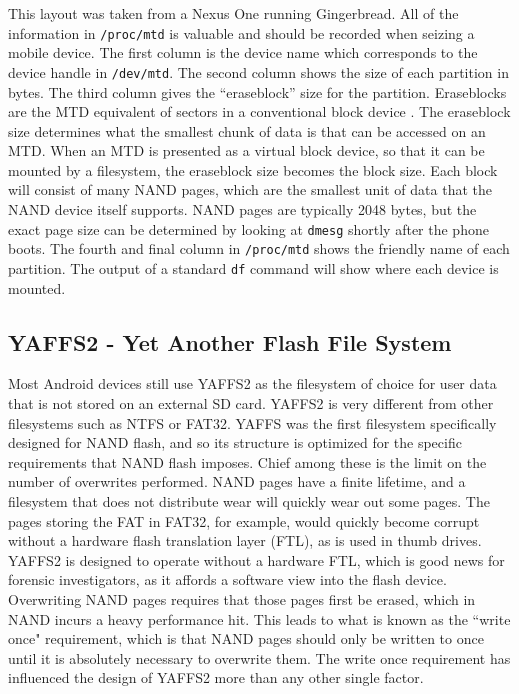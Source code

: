 This layout was taken from a Nexus One running Gingerbread.  All of the information in \texttt{/proc/mtd} is valuable and should be
recorded when seizing a mobile device. The first column is the device name which corresponds to the device handle in
\texttt{/dev/mtd}.  The second column shows the size of each partition in bytes. 
The third column gives the ``eraseblock'' size for the partition.  Eraseblocks are the MTD equivalent of sectors in a conventional block
device \cite{mtdfaq}. The eraseblock size determines what the smallest chunk of data is that can be accessed on an MTD.  When an MTD
is presented as a virtual block device, so that it can be mounted by a filesystem, the eraseblock size becomes the block size.  Each
block will consist of many NAND pages, which are the smallest unit of data that the NAND device itself supports.  NAND pages are
typically 2048 bytes, but the exact page size can be determined by looking at \texttt{dmesg} shortly after the phone boots.  The
fourth and final column in \texttt{/proc/mtd} shows the friendly name of each partition.  The output of a standard \texttt{df}
command will show where each device is mounted.

\subsection{YAFFS2 - Yet Another Flash File System}
Most Android devices still use YAFFS2 as the filesystem of choice for user data that is not stored on an external SD card.  YAFFS2 is
very different from other filesystems such as NTFS or FAT32.  YAFFS was the first filesystem specifically designed for NAND flash,
and so its structure is optimized for the specific requirements that NAND flash imposes.  Chief among these is the limit on the
number of overwrites performed.  NAND pages have a finite lifetime, and a filesystem that does not distribute wear will quickly wear
out some pages.  The pages storing the FAT in FAT32, for example, would quickly become corrupt without a hardware flash translation
layer (FTL), as is used in thumb drives.  YAFFS2 is designed to operate without a hardware FTL, which is good news for forensic
investigators, as it affords a software view into the flash device.  Overwriting NAND pages requires that those pages first be
erased, which in NAND incurs a heavy performance hit.  This leads to what is known as the ``write once" requirement, which is that
NAND pages should only be written to once until it is absolutely necessary to overwrite them. The write once requirement has
influenced the design of YAFFS2 more than any other single factor.

